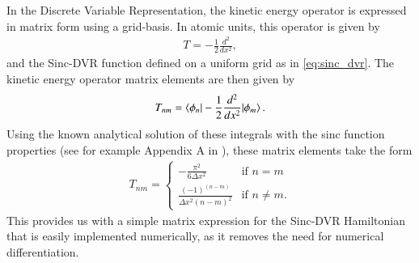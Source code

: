 \documentclass{subfiles}
\begin{document}
In the Discrete Variable Representation, the kinetic energy operator is expressed in matrix form using a grid-basis. In atomic units, this operator is given by
\begin{align*}
    T = -\frac{1}{2} \frac{d^2}{dx^2} ,
\end{align*}
and the Sinc-DVR function defined on a uniform grid as in \eqref{eq:sinc_dvr}. The kinetic energy operator matrix elements are then given by
\begin{align*}
    T_{nm} = \braket{\phi_n|-\frac{1}{2} \frac{d^2}{dx^2}|\phi_m}.
\end{align*}
Using the known analytical solution of these integrals with the sinc function properties (see for example Appendix A in \cite{colbert1992novel}), these matrix elements take the form 
\begin{align}
    T_{nm} = \begin{cases}
        -\frac{\pi^2}{6\Delta x^2} & \text{if } n = m \\
        \frac{(-1)^(n-m)}{\Delta x^2(n - m)^2} & \text{if } n \neq m.
    \end{cases}\label{eq:sinc_dvr_kinetic}
\end{align}
This provides us with a simple matrix expression for the Sinc-DVR Hamiltonian that is easily implemented numerically, as it removes the need for numerical differentiation. 
\end{document}
